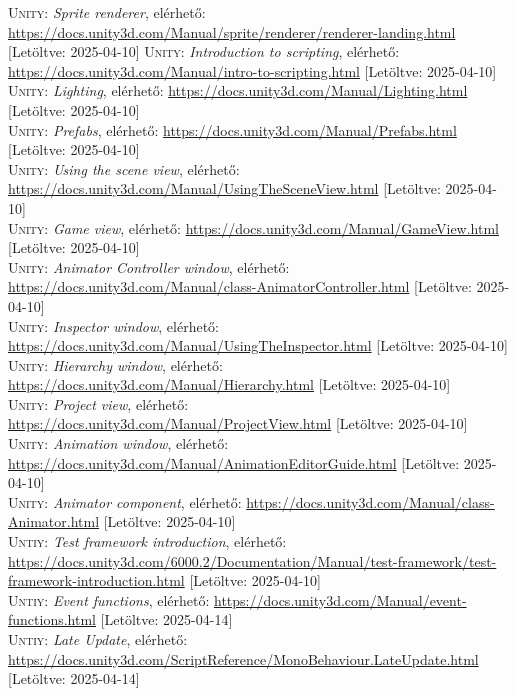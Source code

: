 \documentclass[
]{thesis-ekf}
\theoremstyle{definition}
\theoremstyle{remark}
\begin{document}
\begin{thebibliography}{2}
\textsc{Unity}: \emph{Sprite renderer}, elérhető:
\url{https://docs.unity3d.com/Manual/sprite/renderer/renderer-landing.html} [Letöltve: 2025-04-10]
\textsc{Unity}: \emph{Introduction to scripting}, elérhető:
\url{https://docs.unity3d.com/Manual/intro-to-scripting.html} [Letöltve: 2025-04-10]
\textsc{Unity}: \emph{Lighting}, elérhető:
\url{https://docs.unity3d.com/Manual/Lighting.html} [Letöltve: 2025-04-10]\\
\textsc{Unity}: \emph{Prefabs}, elérhető:
\url{https://docs.unity3d.com/Manual/Prefabs.html} [Letöltve: 2025-04-10]\\
\textsc{Unity}: \emph{Using the scene view}, elérhető:
\url{https://docs.unity3d.com/Manual/UsingTheSceneView.html} [Letöltve: 2025-04-10]\\
\textsc{Unity}: \emph{Game view}, elérhető:
\url{https://docs.unity3d.com/Manual/GameView.html} [Letöltve: 2025-04-10]\\
\textsc{Unity}: \emph{Animator Controller window}, elérhető:
\url{https://docs.unity3d.com/Manual/class-AnimatorController.html} [Letöltve: 2025-04-10]\\
\textsc{Unity}: \emph{Inspector window}, elérhető:
\url{https://docs.unity3d.com/Manual/UsingTheInspector.html} [Letöltve: 2025-04-10]
\textsc{Unity}: \emph{Hierarchy window}, elérhető:
\url{https://docs.unity3d.com/Manual/Hierarchy.html} [Letöltve: 2025-04-10]\\
\textsc{Unity}: \emph{Project view}, elérhető:
\url{https://docs.unity3d.com/Manual/ProjectView.html} [Letöltve: 2025-04-10]\\
\textsc{Unity}: \emph{Animation window}, elérhető:
\url{https://docs.unity3d.com/Manual/AnimationEditorGuide.html} [Letöltve: 2025-04-10]\\
\textsc{Unity}: \emph{Animator component}, elérhető:
\url{https://docs.unity3d.com/Manual/class-Animator.html} [Letöltve: 2025-04-10]\\
\textsc{Untiy}: \emph{Test framework introduction}, elérhető:
\url{https://docs.unity3d.com/6000.2/Documentation/Manual/test-framework/test-framework-introduction.html} [Letöltve: 2025-04-10]\\
\textsc{Untiy}: \emph{Event functions}, elérhető:
\url{https://docs.unity3d.com/Manual/event-functions.html} [Letöltve: 2025-04-14]\\
\textsc{Untiy}: \emph{Late Update}, elérhető:
\url{https://docs.unity3d.com/ScriptReference/MonoBehaviour.LateUpdate.html} [Letöltve: 2025-04-14]\\


\end{thebibliography}
\end{document}
